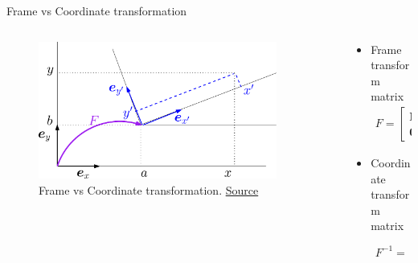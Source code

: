 \documentclass[10pt,xcolor={table,dvipsnames},t]{beamer}
\begin{document}
\begin{frame}{Frame vs Coordinate transformation}

  \begin{columns}
    \begin{column}{0.7\textwidth}
      \begin{figure}
        \centering
        \includegraphics[width=0.9\textwidth]{figures/coord-frame.pdf}
        \caption{Frame vs Coordinate transformation. \href{https://staff.fnwi.uva.nl/r.vandenboomgaard/ComputerVision/LectureNotes/MATH/homogenous.html\#coordinate-frame-transforms}{Source}}
      \end{figure}
    \end{column}
    
    \begin{column}{0.3\textwidth}
\begin{itemize}
  \item Frame transform matrix \footnotemark[3]
  \begin{align*}
    F = \begin{bmatrix}
    \mathbf{R} & \mathbf{t} \\
    \mathbf{0}^T & 1
    \end{bmatrix}.
  \end{align*}
 \item Coordinate transform matrix \footnotemark[4]
   \begin{align*}
    F^{-1} = \begin{bmatrix}
    \mathbf{R}^T & -\mathbf{R}^T\mathbf{t} \\
    \mathbf{0}^T & 1
    \end{bmatrix}.
   \end{align*}
\end{itemize}
    \end{column}

  \end{columns}

\end{frame}
\end{document}
